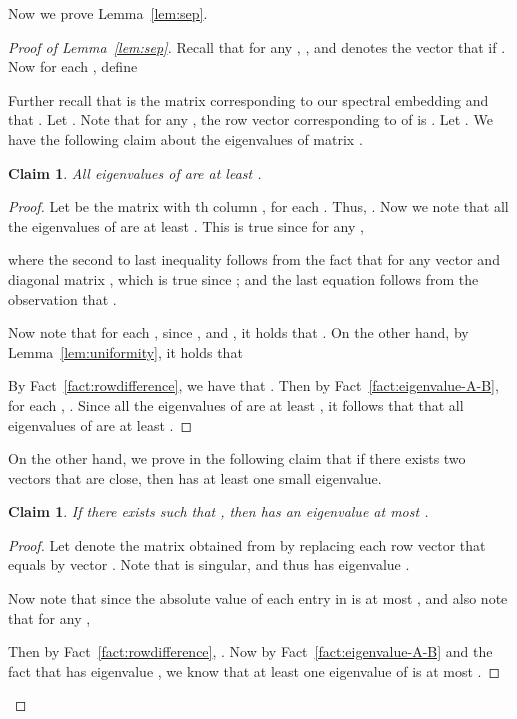 \documentclass[11pt]{article}
\theoremstyle{plain}
\newtheorem{claim}[theorem]{Claim}
\begin{document}
Now we prove Lemma~\ref{lem:sep}.
\begin{proof}[Proof of Lemma~\ref{lem:sep}]
Recall that for any , ,  and
 denotes the vector that  if . Now for each , define

Further recall that  is the matrix corresponding
to our spectral embedding and that . Let
.
Note that for any , the row vector corresponding to  of 
is . Let .
We have the following claim about the eigenvalues of matrix .

\begin{claim}\label{lem:eigen_lower}
All eigenvalues of  are at least
.
\end{claim}

\begin{proof}
Let  be the  matrix with th column , for each
. Thus, . Now we note that all the
eigenvalues of  are at least . This is true since for any
,

where the second to last inequality follows from the fact that
 for
any vector  and diagonal matrix , which is true since
; and the last equation follows from the observation that .

Now note that for each ,
since , and , it holds that
. On the other hand, by
Lemma~\ref{lem:uniformity}, it holds that


By Fact~\ref{fact:rowdifference}, we have that
.
Then by Fact~\ref{fact:eigenvalue-A-B}, for each ,
. Since all the eigenvalues of
 are at least , it follows that that
all eigenvalues of  are at least
.
\end{proof}

On the other hand, we prove in the following claim that if there exists two vectors
 that are close, then  has at least
one small eigenvalue.

\begin{claim}\label{lem:eigen_upper}
If there exists  such that ,
then  has an eigenvalue at most
.
\end{claim}
\begin{proof}Let  denote the  matrix obtained from  by
replacing each row vector that equals  by vector . Note that
 is singular, and thus has eigenvalue .

Now note that
 since the
absolute value of each entry in  is at most , and also note that
for any ,


Then by Fact~\ref{fact:rowdifference},
.
Now by Fact~\ref{fact:eigenvalue-A-B} and the fact that  has
eigenvalue , we know that at least one eigenvalue of  is at
most .
\end{proof}


\end{proof}
\end{document}
